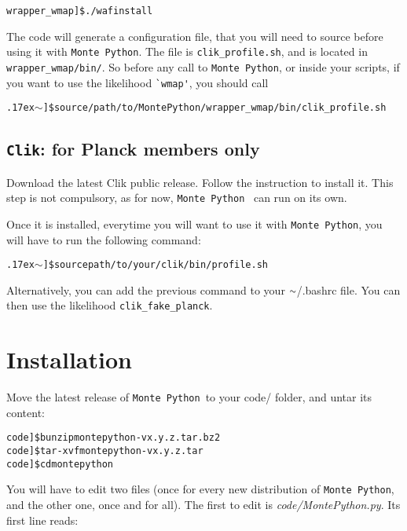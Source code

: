 \documentclass[10pt]{article}
\newcommand{\MP}{\texttt{Monte Python}}
\newcommand{\Clik}{\texttt{Clik}}
\newcommand{\tild}{\raise.17ex\hbox{$\scriptstyle\mathtt{\sim}$}}
\begin{document}
  \begin{alltt}
    wrapper_wmap]\$ ./waf install
  \end{alltt}

  The code will generate a configuration file, that you will need to source
  before using it with \MP. The file is \verb?clik_profile.sh?, and is located
  in \verb?wrapper_wmap/bin/?. So before any call to \MP, or inside your
  scripts, if you want to use the likelihood \verb?`wmap'?, you should call

  \begin{alltt}
    \tild]\$ source /path/to/MontePython/wrapper_wmap/bin/clik_profile.sh
  \end{alltt}


  \subsection{\Clik: for Planck members only}

  Download the latest Clik public release. Follow the instruction to install
  it. This step is not compulsory, as for now, \MP~ can run on its own.

  Once it is installed, everytime you will want to use it with \MP,
  you will have to run the following command:

  \begin{alltt}
    \tild]\$ source path/to/your/clik/bin/profile.sh
  \end{alltt}
  
  Alternatively, you can add the previous command to your $\tild$/.bashrc file.
  You can then use the likelihood \verb?clik_fake_planck?.

\newpage
\section{Installation\label{sec:installation}}

  Move the latest release of \MP\, to your code/ folder, and untar its
  content:

  \begin{alltt} 
    code]\$ bunzip montepython-vx.y.z.tar.bz2 
    code]\$ tar -xvf montepython-vx.y.z.tar
    code]\$ cd montepython
  \end{alltt}

 You will have to edit two files (once for every new distribution of \MP, and
 the other one, once and for all). The first to edit is
 \emph{code/MontePython.py}. Its first line reads:
\end{document}
